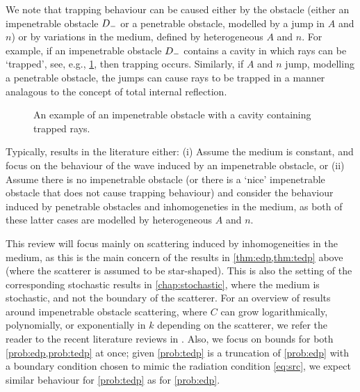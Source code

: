 We note that trapping behaviour can be caused either by the obstacle (either an impenetrable obstacle $\Dm$ or a penetrable obstacle, modelled by a jump in $A$ and $n$) or by variations in the medium, defined by heterogeneous $A$ and $n$. For example, if an impenetrable obstacle $\Dm$ contains a cavity in which rays can be `trapped', see, e.g., \cref{fig:trapping}, then trapping occurs. Similarly, if $A$ and $n$ jump, modelling a penetrable obstacle, the jumps can cause rays to be trapped in a manner analagous to the concept of total internal reflection.

\begin{figure}
\centering
\begin{tikzpicture}[scale=2]

\end{tikzpicture}
\caption{An example of an impenetrable obstacle with a cavity containing trapped rays.}\label{fig:trapping}
\end{figure}

Typically, results in the literature either: (i) Assume the medium is constant, and focus on the behaviour of the wave induced by an impenetrable obstacle, or (ii) Assume there is no impenetrable obstacle (or there is a `nice' impenetrable obstacle that does not cause trapping behaviour) and consider the behaviour induced by penetrable obstacles and inhomogeneties in the medium, as both of these latter cases are modelled by heterogeneous $A$ and $n$.

This review will focus mainly on scattering induced by inhomogeneities in the medium, as this is the main concern of the results in \cref{thm:edp,thm:tedp} above (where the scatterer is assumed to be star-shaped). This is also the setting of the corresponding stochastic results in \cref{chap:stochastic}, where the medium is stochastic, and not the boundary of the scatterer. For an overview of results around impenetrable obstacle scattering, where $C$ can grow logarithmically, polynomially, or exponentially in $k$ depending on the scatterer, we refer the reader to the recent literature reviews in \cite[Sections 1.1 and 1.3]{ChSpGiSm:17}. Also, we focus on bounds for both \cref{prob:edp,prob:tedp} at once; given \cref{prob:tedp} is a truncation of \cref{prob:edp} with a boundary condition chosen to mimic the radiation condition \cref{eq:src}, we expect similar behaviour for \cref{prob:tedp} as for \cref{prob:edp}.

